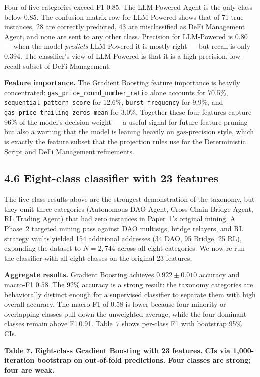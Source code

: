 \documentclass[sigconf,nonacm=false]{acmart}
\begin{document}
Four of five categories exceed F1 0.85. The LLM-Powered Agent is the only class below 0.85. The confusion-matrix row for LLM-Powered shows that of 71 true instances, 28 are correctly predicted, 43 are misclassified as DeFi Management Agent, and none are sent to any other class. Precision for LLM-Powered is 0.80 --- when the model \textit{predicts} LLM-Powered it is mostly right --- but recall is only 0.394. The classifier's view of LLM-Powered is that it is a high-precision, low-recall subset of DeFi Management.

\textbf{Feature importance.} The Gradient Boosting feature importance is heavily concentrated: \texttt{gas\_price\_round\_number\_ratio} alone accounts for 70.5\%, \texttt{sequential\_pattern\_score} for 12.6\%, \texttt{burst\_frequency} for 9.9\%, and \texttt{gas\_price\_trailing\_zeros\_mean} for 3.0\%. Together these four features capture 96\% of the model's decision weight --- a useful signal for future feature-pruning but also a warning that the model is leaning heavily on gas-precision style, which is exactly the feature subset that the projection rules use for the Deterministic Script and DeFi Management refinements.

\subsection{4.6 Eight-class classifier with 23 features}

The five-class results above are the strongest demonstration of the taxonomy, but they omit three categories (Autonomous DAO Agent, Cross-Chain Bridge Agent, RL Trading Agent) that had zero instances in Paper~1's original mining. A Phase~2 targeted mining pass against DAO multisigs, bridge relayers, and RL strategy vaults yielded 154 additional addresses (34 DAO, 95 Bridge, 25 RL), expanding the dataset to $N = 2{,}744$ across all eight categories. We now re-run the classifier with all eight classes on the original 23 features.

\textbf{Aggregate results.} Gradient Boosting achieves $0.922 \pm 0.010$ accuracy and macro-F1 $0.58$. The 92\% accuracy is a strong result: the taxonomy categories are behaviorally distinct enough for a supervised classifier to separate them with high overall accuracy. The macro-F1 of 0.58 is lower because four minority or overlapping classes pull down the unweighted average, while the four dominant classes remain above F1\,0.91. Table~7 shows per-class F1 with bootstrap 95\% CIs.

\textbf{Table 7. Eight-class Gradient Boosting with 23 features. CIs via 1,000-iteration bootstrap on out-of-fold predictions. Four classes are strong; four are weak.}
\end{document}
